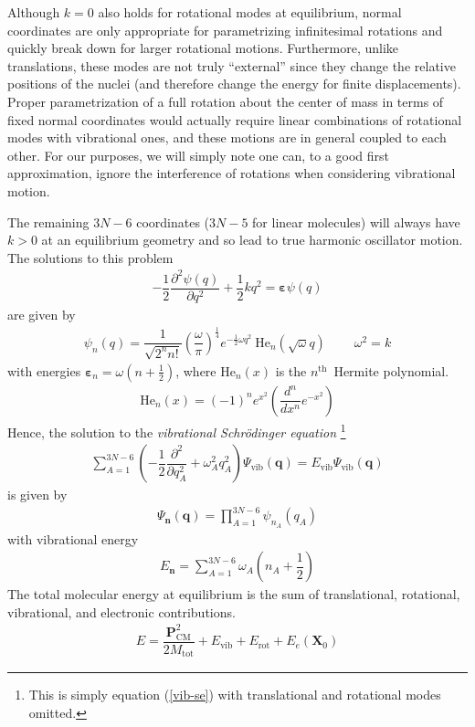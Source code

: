\documentclass[11pt]{article}
\newcommand{\bo}[1]{\ensuremath{\mathbf{#1}}}
\renewcommand{\sp}{\ \ \ \ \ \ \ \ \ \ }
\newcommand{\fr}[2]{\dfrac{#1}{#2}}
\newcommand{\pr}[1]{\left(#1\right)}
\newcommand{\pd}[3]{\ensuremath{ \dfrac{ \partial^{#1} #2 }{\partial #3 ^{#1}}}}
\newcommand{\eth}{\ensuremath{^\text{th}}}
\newcommand{\Y}{\ensuremath{\Psi}}
\newcommand{\y}{\ensuremath{\psi}}
\newcommand{\w}{\ensuremath{\omega}}
\newcommand{\e}{\ensuremath{\bm\varepsilon}}
\begin{document}
Although $k=0$ also holds for rotational modes at equilibrium, normal
coordinates are only appropriate for parametrizing infinitesimal rotations and
quickly break down for larger rotational motions.
Furthermore, unlike translations, these modes are not truly
``external'' since they change the relative positions of the nuclei (and
therefore change the energy for finite displacements). Proper parametrization
of a full rotation about the center of mass in terms of fixed normal
coordinates would actually require linear combinations of rotational modes
 with vibrational ones, and these
motions are in general coupled to each other. For our purposes, we will simply
note one can, to a good first approximation, ignore the interference of
rotations when considering vibrational motion.

The remaining $3N-6$ coordinates ($3N-5$ for linear molecules) will always have
$k>0$ at an equilibrium geometry and so lead to true harmonic oscillator
motion. The solutions to this problem
\begin{align}
-\fr{1}{2}
    \pd{2}{\y(q)}{q}
+\fr{1}{2}
    k
    q^2
=
    \e
    \y(q)
\end{align}
are given by
\begin{align}
    \y_{n}(q)
=
\fr{1}{\sqrt{2^n n!}}\pr{\fr{\w}{\pi}}^{\frac{1}{4}}
    e^{-\frac{1}{2}\w q^2}
    \ \text{He}_n(\sqrt{\w}q)
\sp
    \w^2=k
\end{align}
with energies $\e_{n}=\w(n+\frac{1}{2})$, where $\text{He}_n(x)$ is the
$n$\eth\ Hermite polynomial.
\begin{align}
    \text{He}_n(x)
=   (-1)^n
    e^{x^2}
    \pr{\fr{d^n}{dx^n}e^{-x^2}}
\end{align}
Hence, the solution to the {\it vibrational Schr\"odinger equation}
\footnote{This is simply equation (\ref{vib-se}) with translational and
rotational modes omitted.}
\begin{align}
\sum_{A=1}^{3N-6}
    \pr{-\fr{1}{2}\pd{2}{}{q_A}+\w_A^2q_A^2}
    \Y_\text{vib}(\bo{q})
=
    E_\text{vib}
    \Y_\text{vib}(\bo{q})
\end{align}
is given by
\begin{align}
    \Y_{\bo{n}}(\bo{q})
    = \prod_{A=1}^{3N-6}
    \y_{n_A}(q_A)
\end{align}
with vibrational energy
\begin{align}
    E_{\bo{n}}
=
\sum_{A=1}^{3N-6}
    \w_A
    \pr{n_A+\fr{1}{2}}
\end{align}
The total molecular energy at equilibrium is the sum of translational,
rotational, vibrational, and electronic contributions.
\begin{align}
    E
    = \fr{\bo{P}_\text{CM}^2}{2M_\text{tot}}
    + E_\text{vib}
    + E_\text{rot}
    + E_e(\bo{X}_0)
\end{align}
\end{document}

